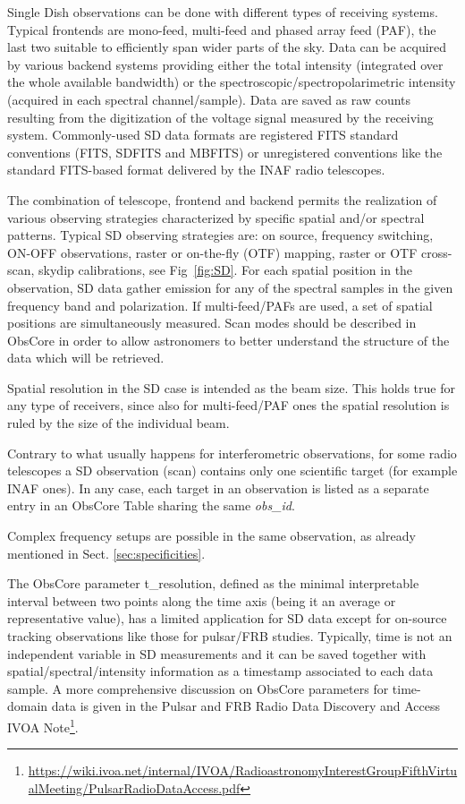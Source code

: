 \documentclass[11pt,a4paper]{ivoa}
\begin{document}
Single Dish observations can be done with different types of receiving systems. Typical frontends are mono-feed, multi-feed and phased array feed (PAF), the last two suitable to efficiently span wider parts of the sky. 
Data can be acquired by various backend systems providing either the total intensity (integrated over the whole available bandwidth) or the spectroscopic/spectropolarimetric intensity (acquired in each spectral channel/sample).
Data are saved as raw counts resulting from the digitization of the voltage signal measured by the receiving system.
Commonly-used SD data formats are registered FITS standard conventions (FITS, SDFITS and MBFITS) or unregistered conventions like the standard FITS-based format delivered by the INAF radio telescopes.

The combination of telescope, frontend and backend permits the realization of various observing strategies characterized by specific spatial and/or spectral patterns.
Typical SD observing strategies are: on source, frequency switching, ON-OFF observations, raster or on-the-fly (OTF) mapping, raster or OTF cross-scan, skydip calibrations, see Fig~\ref{fig:SD}. For each spatial position in the observation, SD data gather emission for any of the spectral samples in the given frequency band and polarization.  
If multi-feed/PAFs are used, a set of spatial positions are simultaneously measured. Scan modes should be described in ObsCore in order to allow astronomers to better understand the structure of the data which will be retrieved.

Spatial resolution in the SD case is intended as the beam size. This holds true for any type of receivers, since also for multi-feed/PAF ones the spatial resolution is ruled by the size of the individual beam. 

Contrary to what usually happens for  interferometric observations, for some radio telescopes a SD observation (scan) contains only one scientific target (for example INAF ones). In any case, each target in an observation is listed as a separate entry in an ObsCore Table sharing the same \emph{obs\_id}.

Complex frequency setups are possible in the same observation, as already mentioned in Sect. \ref{sec:specificities}.

The ObsCore parameter t\_resolution, defined as the minimal interpretable interval between two points along the
time axis (being it an average or representative value), has a limited application for SD data except for on-source tracking
observations like those for pulsar/FRB studies.
Typically, time is not an independent variable in SD measurements and it can be saved together with spatial/spectral/intensity
information as a timestamp associated to each data sample.
A more comprehensive discussion on ObsCore parameters for time-domain data is given in the Pulsar
and FRB Radio Data Discovery and Access IVOA Note\footnote{\url{https://wiki.ivoa.net/internal/IVOA/RadioastronomyInterestGroupFifthVirtualMeeting/PulsarRadioDataAccess.pdf}}.
\end{document}
